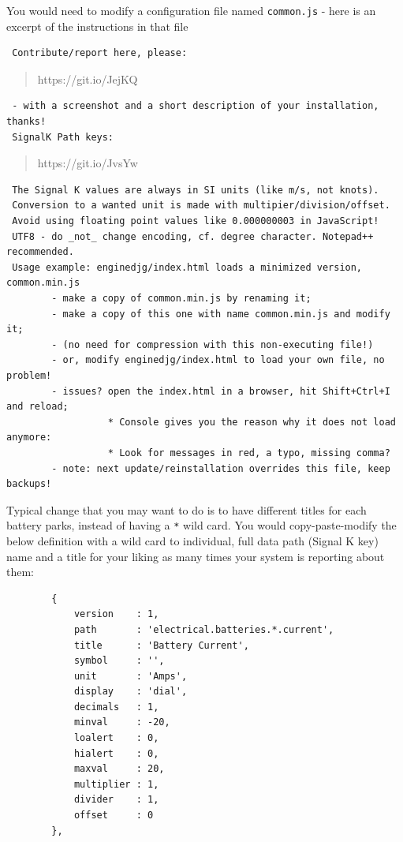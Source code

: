 \documentclass[11pt]{article}
\begin{document}
    You would need to modify a configuration file named \texttt{common.js} -
here is an excerpt of the instructions in that file

    \begin{verbatim}
 Contribute/report here, please:
\end{verbatim}

\begin{quote}
https://git.io/JejKQ
\end{quote}

\begin{verbatim}
 - with a screenshot and a short description of your installation, thanks!
 SignalK Path keys:
\end{verbatim}

\begin{quote}
https://git.io/JvsYw
\end{quote}

\begin{verbatim}
 The Signal K values are always in SI units (like m/s, not knots).
 Conversion to a wanted unit is made with multipier/division/offset.
 Avoid using floating point values like 0.000000003 in JavaScript!
 UTF8 - do _not_ change encoding, cf. degree character. Notepad++ recommended.
 Usage example: enginedjg/index.html loads a minimized version, common.min.js
        - make a copy of common.min.js by renaming it;
        - make a copy of this one with name common.min.js and modify it;
        - (no need for compression with this non-executing file!)
        - or, modify enginedjg/index.html to load your own file, no problem!
        - issues? open the index.html in a browser, hit Shift+Ctrl+I and reload;
                  * Console gives you the reason why it does not load anymore:
                  * Look for messages in red, a typo, missing comma?
        - note: next update/reinstallation overrides this file, keep backups!
\end{verbatim}

    Typical change that you may want to do is to have different titles for
each battery parks, instead of having a \texttt{*} wild card. You would
copy-paste-modify the below definition with a wild card to individual,
full data path (Signal K key) name and a title for your liking as many
times your system is reporting about them:

    \begin{verbatim}
        {
            version    : 1,
            path       : 'electrical.batteries.*.current',
            title      : 'Battery Current',
            symbol     : '',
            unit       : 'Amps',
            display    : 'dial',
            decimals   : 1,
            minval     : -20,
            loalert    : 0,
            hialert    : 0,
            maxval     : 20,
            multiplier : 1,
            divider    : 1,
            offset     : 0
        },
\end{verbatim}
\end{document}
